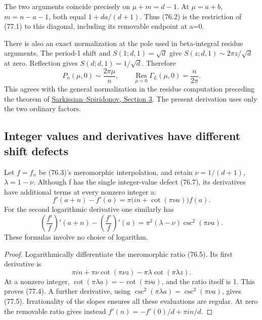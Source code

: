 \documentclass[11pt,reqno]{amsart}
\theoremstyle{plain}
\begin{document}
The two arguments coincide precisely on \(\mu+m=d-1\).
At \(\mu=a+b\), \(m=n-a-1\), both equal
\(1+da/(d+1)\). Thus (76.2) is the restriction of (77.1)
to this diagonal, including its removable endpoint at a=0.

There is also an exact normalization at the pole used in beta-integral
residue arguments. The period-1 shift and \(S(1;d,1)=\sqrt d\)
give \(S(z;d,1)\sim2\pi z/\sqrt d\) at zero. Reflection gives
\(S(d;d,1)=1/\sqrt d\). Therefore
\begin{equation*}
 P_n(\mu,0)\sim\frac{2\pi\mu}{n},\qquad
 \boxed{\operatorname*{Res}_{\mu=0}\Gamma_L(\mu,0)
 =\frac{n}{2\pi}.}
 \tag{77.3}
\end{equation*}
This agrees with the general normalization in the residue computation
preceding the theorem of
\href{https://arxiv.org/html/1910.11747\#S3}{Sarkissian--Spiridonov, Section 3}.
The present derivation uses only the two ordinary factors.

\subsection{Integer values and derivatives have different shift defects}\label{sec:77.2}

Let \(f=f_n\) be (76.3)'s meromorphic interpolation, and retain
\(\nu=1/(d+1)\), \(\lambda=1-\nu\). Although f has the
single integer-value defect (76.7), its derivatives have additional
terms at every nonzero integer a:
\begin{equation*}
 \boxed{\displaystyle
 f'(a+n)-f'(a)=
 \pi\bigl(in+\cot(\pi\nu a)\bigr)f(a).}
 \tag{77.4}
\end{equation*}
For the second logarithmic derivative one similarly has
\begin{equation*}
 \left(\frac{f'}f\right)'(a+n)
 -\left(\frac{f'}f\right)'(a)
 =\pi^2(\lambda-\nu)\csc^2(\pi\nu a).
 \tag{77.5}
\end{equation*}
These formulas involve no choice of logarithm.

\begin{proof}
Logarithmically differentiate the meromorphic ratio (76.5).
Its first derivative is
\[
 \pi in+\pi\nu\cot(\pi\nu z)
          -\pi\lambda\cot(\pi\lambda z).
\]
At a nonzero integer, \(\cot(\pi\lambda a)=-\cot(\pi\nu a)\),
and the ratio itself is 1. This proves (77.4). A further derivative,
using \(\csc^2(\pi\lambda a)=\csc^2(\pi\nu a)\), gives
(77.5). Irrationality of the slopes ensures all these evaluations are
regular. At zero the removable ratio gives instead
\(f'(n)=-f'(0)/d+\pi in/d\).
\end{proof}
\end{document}

